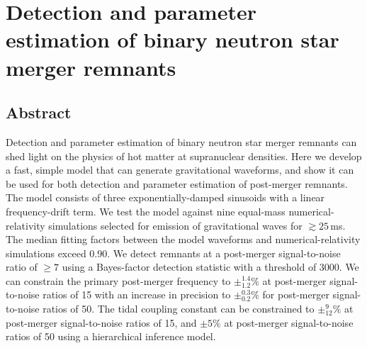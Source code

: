 \documentclass[../Thesis.tex]{subfiles}
\begin{document}
\begingroup
\clearpage%
\let\clearpage\relax%
\vspace*{-2cm}%



\chapter{Detection and parameter estimation of binary neutron star merger remnants}
\label{chapter:DetectionPE}
\endgroup




\section*{Abstract}
    Detection and parameter estimation of binary neutron star merger remnants can shed light on the physics of hot matter at supranuclear densities.
    Here we develop a fast, simple model that can generate gravitational waveforms, and show it can be used for both detection and parameter estimation of post-merger remnants.
    The model consists of three exponentially-damped sinusoids with a linear frequency-drift term.
    We test the model against nine equal-mass numerical-relativity simulations selected for emission of gravitational waves for $\gtrsim25$\,ms.
    The median fitting factors between the model waveforms and numerical-relativity simulations exceed 0.90.
    We detect remnants at a post-merger signal-to-noise ratio of $\ge 7$ using a Bayes-factor detection statistic with a threshold of 3000.
    We can constrain the primary post-merger frequency to $\pm_{1.2}^{1.4}\%$ at post-merger signal-to-noise ratios of 15 with an increase in precision to $\pm_{0.2}^{0.3}\%$ for post-merger signal-to-noise ratios of 50.
    The tidal coupling constant can be constrained to $\pm^{9}_{12}\%$ at post-merger signal-to-noise ratios of 15, and $\pm 5\%$ at post-merger signal-to-noise ratios of 50 using a hierarchical inference model.
\end{document}

